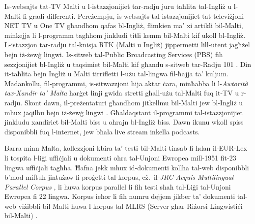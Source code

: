 \begin{multicols}{2}
Is-websajts tat-TV Malti u l-istazzjonijiet tar-radju juru taħlita tal-Ingliż u l-Malti fi gradi differenti. Pereżempju, is-websajts tal-istazzjonijiet tat-televiżjoni NET TV \cite{NetTV1} u One TV \cite{OneTV1} għandhom qafas bl-Ingliż, flimkien ma’ xi artikli bil-Malti, minkejja li l-programm tagħhom jinkludi titli kemm bil-Malti kif ukoll bl-Ingliż. L-istazzjon tar-radju tal-knisja RTK \cite{RTK1} (Malti u Ingliż) jippermetti lill-utent jagħżel bejn iż-żewġ lingwi. Is-sitweb tal-Public Broadcasting Services (PBS) \cite{PBS1} fih sezzjonijiet bl-Ingliż u taqsimiet bil-Malti kif għandu s-sitweb tar-Radju 101 \cite{radio101}. Din it-taħlita bejn Ingliż u Malti tirrifletti l-użu tal-lingwa fil-ħajja ta’ kuljum. Madankollu, fil-programmi, is-sitwazzjoni hija aktar ċara, minħabba li l-\emph{Awtorità tax-Xandir ta’ Malta} ħarġet linji gwida stretti għall-użu tal-Malti fuq it-TV u r-radju. Skont dawn, il-preżentaturi għandhom jitkellmu bil-Malti jew bl-Ingliż u mhux jaqilbu bejn iż-żewġ lingwi \cite{Fabri:2011a}. Għaldaqstant il-programmi tal-istazzjonijiet jinkludu xandiriet bil-Malti biss u oħrajn bl-Ingliż biss. Dawn ikunu wkoll spiss disponibbli fuq l-internet, jew bħala live stream inkella podcasts.

Barra minn Malta, kollezzjoni kbira ta’ testi bil-Malti tinsab fi ħdan il-EUR-Lex \cite{EURLex1} li tospita l-liġi uffiċjali u dokumenti oħra tal-Unjoni Ewropea mill-1951 fit-23 lingwa uffiċjali tagħha.
Ħafna jekk mhux id-dokumenti kollha tal-web disponibbli b’mod miftuħ jintużaw fi proġetti tal-korpus, eż.~il-\emph{JRC-Acquis Multilingual Parallel Corpus} \cite{JRC-Acquis1}, li huwa korpus parallel li fih testi sħaħ tal-Liġi tal-Unjoni Ewropea fi 22 lingwa. Korpus ieħor li fih numru dejjem jikber ta’ dokumenti tal-web viżibbli bil-Malti huwa l-korpus tal-MLRS (Server għar-Riżorsi Lingwistiċi bil-Malti) \cite{MLRS1}.
\end{multicols}

\clearpage



